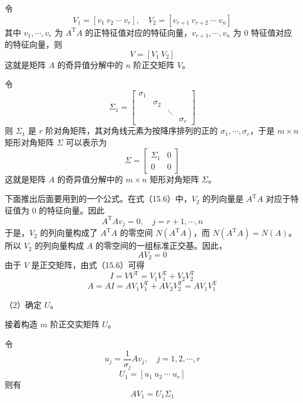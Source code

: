 \documentclass[UTF8,12pt,a4paper,fontset=fandol]{ctexart}
\begin{document}
令
\[
V_1=[v_1\ v_2\ \cdots\ v_r],\quad
V_2=[v_{r+1}\ v_{r+2}\ \cdots\ v_n]
\]
其中 $v_1,\cdots,v_r$ 为 $A^{\mathrm{T}}A$ 的正特征值对应的特征向量，$v_{r+1},\cdots,v_n$ 为 0 特征值对应的特征向量，则
\begin{equation}
V=[V_1\ V_2]
\tag{15.6}
\end{equation}
这就是矩阵 $A$ 的奇异值分解中的 $n$ 阶正交矩阵 $V$。

令
\[
\Sigma_1=
\begin{bmatrix}
\sigma_1&&\\
&\sigma_2&\\
&&\ddots\\
&&&\sigma_r
\end{bmatrix}
\]
则 $\Sigma_1$ 是 $r$ 阶对角矩阵，其对角线元素为按降序排列的正的 $\sigma_1,\cdots,\sigma_r$，于是 $m\times n$ 矩形对角矩阵 $\Sigma$ 可以表示为
\begin{equation}
\Sigma=
\begin{bmatrix}
\Sigma_1&0\\
0&0
\end{bmatrix}
\tag{15.7}
\end{equation}
这就是矩阵 $A$ 的奇异值分解中的 $m\times n$ 矩形对角矩阵 $\Sigma$。

下面推出后面要用到的一个公式。在式（15.6）中，$V_2$ 的列向量是 $A^{\mathrm{T}}A$ 对应于特征值为 0 的特征向量。因此
\begin{equation}
A^{\mathrm{T}}Av_j=0,\quad j=r+1,\cdots,n
\tag{15.8}
\end{equation}
于是，$V_2$ 的列向量构成了 $A^{\mathrm{T}}A$ 的零空间 $N(A^{\mathrm{T}}A)$，而 $N(A^{\mathrm{T}}A)=N(A)$。所以 $V_2$ 的列向量构成 $A$ 的零空间的一组标准正交基。因此，
\begin{equation}
AV_2=0
\tag{15.9}
\end{equation}
由于 $V$ 是正交矩阵，由式（15.6）可得
\begin{equation}
I=VV^{\mathrm{T}}=V_1V_1^{\mathrm{T}}+V_2V_2^{\mathrm{T}}
\tag{15.10}
\end{equation}
\begin{equation}
A=AI=AV_1V_1^{\mathrm{T}}+AV_2V_2^{\mathrm{T}}=AV_1V_1^{\mathrm{T}}
\tag{15.11}
\end{equation}

（2）确定 $U$。

接着构造 $m$ 阶正交实矩阵 $U$。

令
\begin{equation}
u_j=\frac{1}{\sigma_j}Av_j,\quad j=1,2,\cdots,r
\tag{15.12}
\end{equation}
\begin{equation}
U_1=[u_1\ u_2\ \cdots\ u_r]
\tag{15.13}
\end{equation}
则有
\begin{equation}
AV_1=U_1\Sigma_1
\tag{15.14}
\end{equation}
\end{document}
